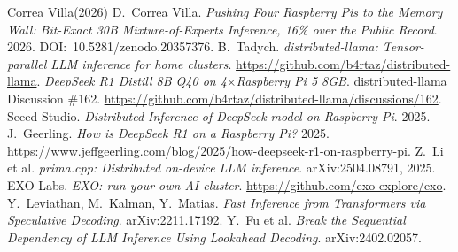 \documentclass[10pt,a4paper]{article}
\begin{document}
\begin{thebibliography}{Correa Villa(2026)}
\small
{} D.~Correa Villa. \emph{Pushing Four Raspberry Pis to the Memory Wall: Bit-Exact 30B Mixture-of-Experts Inference, 16\% over the Public Record}. 2026. DOI:~10.5281/zenodo.20357376.
 B.~Tadych. \emph{distributed-llama: Tensor-parallel LLM inference for home clusters}. \url{https://github.com/b4rtaz/distributed-llama}.
 \emph{DeepSeek R1 Distill 8B Q40 on 4$\times$Raspberry Pi 5 8GB}. distributed-llama Discussion \#162. \url{https://github.com/b4rtaz/distributed-llama/discussions/162}.
 Seeed Studio. \emph{Distributed Inference of DeepSeek model on Raspberry Pi}. 2025.
 J.~Geerling. \emph{How is DeepSeek R1 on a Raspberry Pi?} 2025. \url{https://www.jeffgeerling.com/blog/2025/how-deepseek-r1-on-raspberry-pi}.
 Z.~Li et al. \emph{prima.cpp: Distributed on-device LLM inference}. arXiv:2504.08791, 2025.
 EXO Labs. \emph{EXO: run your own AI cluster}. \url{https://github.com/exo-explore/exo}.
 Y.~Leviathan, M.~Kalman, Y.~Matias. \emph{Fast Inference from Transformers via Speculative Decoding}. arXiv:2211.17192.
 Y.~Fu et al. \emph{Break the Sequential Dependency of LLM Inference Using Lookahead Decoding}. arXiv:2402.02057.
\end{thebibliography}
\end{document}
